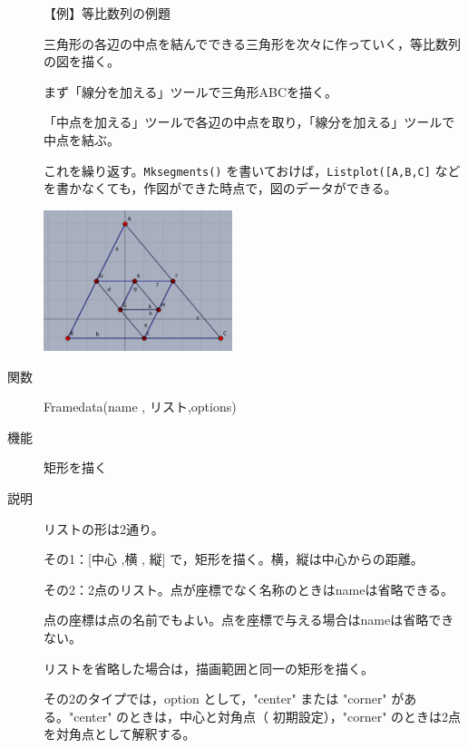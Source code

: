 \documentclass[papersize,a4paper,10pt,uplatex]{jsarticle}
\begin{document}
\begin{description}
\vspace{\baselineskip}
【例】等比数列の例題

三角形の各辺の中点を結んでできる三角形を次々に作っていく，等比数列の図を描く。

まず「線分を加える」ツールで三角形ABCを描く。

「中点を加える」ツールで各辺の中点を取り，「線分を加える」ツールで中点を結ぶ。

これを繰り返す。\verb|Mksegments()| を書いておけば，\verb|Listplot([A,B,C]| などを書かなくても，作図ができた時点で，図のデータができる。

\includegraphics[bb=0.00 0.00 438.02 327.02,width=5.5cm]{Fig/gpro01.pdf} 

\vspace{\baselineskip}
\hypertarget{framedata}{}
\item[関数]Framedata(name , リスト,options)
\item[機能]矩形を描く
\item[説明]リストの形は2通り。

その1：[中心 ,横 , 縦] で，矩形を描く。横，縦は中心からの距離。

その2：2点のリスト。点が座標でなく名称のときはnameは省略できる。

点の座標は点の名前でもよい。点を座標で与える場合はnameは省略できない。

リストを省略した場合は，描画範囲と同一の矩形を描く。

その2のタイプでは，option として，"center" または "corner" がある。"center" のときは，中心と対角点（ 初期設定），"corner" のときは2点を対角点として解釈する。 


\end{description}
\end{document}
